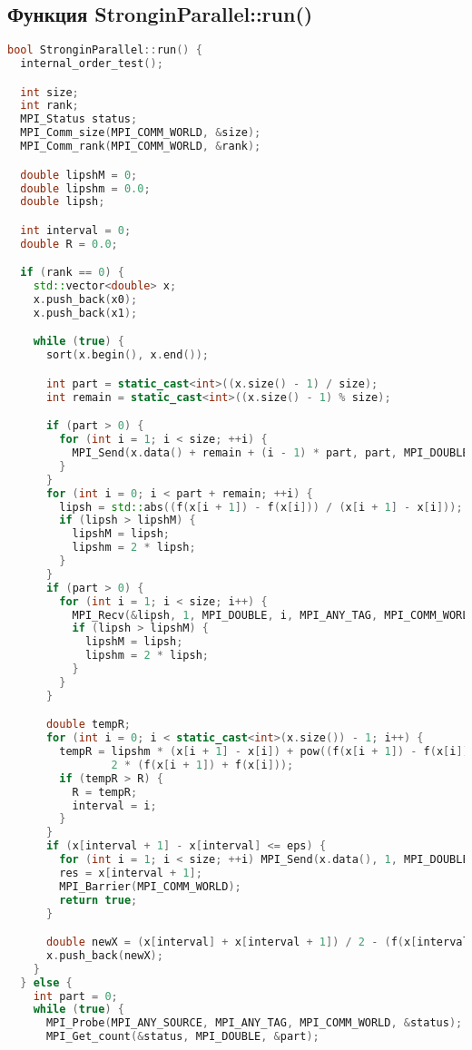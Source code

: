 \documentclass[a4paper,12pt]{article}
\begin{document}
\subsection*{Функция StronginParallel::run()}
\begin{lstlisting}[language=C++]
bool StronginParallel::run() {
  internal_order_test();

  int size;
  int rank;
  MPI_Status status;
  MPI_Comm_size(MPI_COMM_WORLD, &size);
  MPI_Comm_rank(MPI_COMM_WORLD, &rank);

  double lipshM = 0;
  double lipshm = 0.0;
  double lipsh;

  int interval = 0;
  double R = 0.0;

  if (rank == 0) {
    std::vector<double> x;
    x.push_back(x0);
    x.push_back(x1);

    while (true) {
      sort(x.begin(), x.end());

      int part = static_cast<int>((x.size() - 1) / size);
      int remain = static_cast<int>((x.size() - 1) % size);

      if (part > 0) {
        for (int i = 1; i < size; ++i) {
          MPI_Send(x.data() + remain + (i - 1) * part, part, MPI_DOUBLE, i, 0, MPI_COMM_WORLD);
        }
      }
      for (int i = 0; i < part + remain; ++i) {
        lipsh = std::abs((f(x[i + 1]) - f(x[i])) / (x[i + 1] - x[i]));
        if (lipsh > lipshM) {
          lipshM = lipsh;
          lipshm = 2 * lipsh;
        }
      }
      if (part > 0) {
        for (int i = 1; i < size; i++) {
          MPI_Recv(&lipsh, 1, MPI_DOUBLE, i, MPI_ANY_TAG, MPI_COMM_WORLD, &status);
          if (lipsh > lipshM) {
            lipshM = lipsh;
            lipshm = 2 * lipsh;
          }
        }
      }

      double tempR;
      for (int i = 0; i < static_cast<int>(x.size()) - 1; i++) {
        tempR = lipshm * (x[i + 1] - x[i]) + pow((f(x[i + 1]) - f(x[i])), 2) / (lipshm * (x[i + 1] - x[i])) -
                2 * (f(x[i + 1]) + f(x[i]));
        if (tempR > R) {
          R = tempR;
          interval = i;
        }
      }
      if (x[interval + 1] - x[interval] <= eps) {
        for (int i = 1; i < size; ++i) MPI_Send(x.data(), 1, MPI_DOUBLE, i, 1, MPI_COMM_WORLD);
        res = x[interval + 1];
        MPI_Barrier(MPI_COMM_WORLD);
        return true;
      }

      double newX = (x[interval] + x[interval + 1]) / 2 - (f(x[interval + 1]) - f(x[interval])) / (lipshm + lipshm);
      x.push_back(newX);
    }
  } else {
    int part = 0;
    while (true) {
      MPI_Probe(MPI_ANY_SOURCE, MPI_ANY_TAG, MPI_COMM_WORLD, &status);
      MPI_Get_count(&status, MPI_DOUBLE, &part);


\end{lstlisting}
\end{document}
